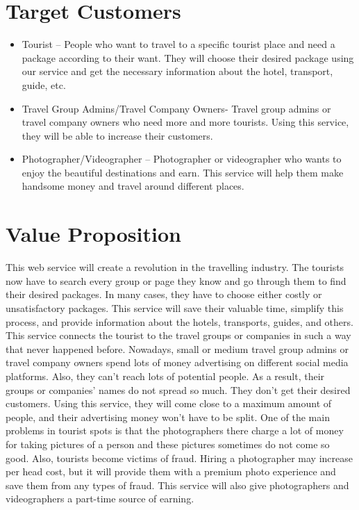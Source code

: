 \documentclass[12pt,a4paper,twoside,openright]{report}
\begin{document}
\section*{Target Customers}
\begin{itemize}
\item Tourist – People who want to travel to a specific tourist place and need a package according to their want. They will choose their desired package using our service and get the necessary information about the hotel, transport, guide, etc.
\item Travel Group Admins/Travel Company Owners- Travel group admins or travel company owners who need more and more tourists. Using this service, they will be able to increase their customers. 
\item Photographer/Videographer – Photographer or videographer who wants to enjoy the beautiful destinations and earn. This service will help them make handsome money and travel around different places.
\end{itemize}

\section*{Value Proposition}
This web service will create a revolution in the travelling industry. The tourists now have to search every group or page they know and go through them to find their desired packages. In many cases, they have to choose either costly or unsatisfactory packages. This service will save their valuable time, simplify this process, and provide information about the hotels, transports, guides, and others. This service connects the tourist to the travel groups or companies in such a way that never happened before. Nowadays, small or medium travel group admins or travel company owners spend lots of money advertising on different social media platforms. Also, they can't reach lots of potential people. As a result, their groups or companies' names do not spread so much. They don't get their desired customers. Using this service, they will come close to a maximum amount of people, and their advertising money won't have to be split. One of the main problems in tourist spots is that the photographers there charge a lot of money for taking pictures of a person and these pictures sometimes do not come so good. Also, tourists become victims of fraud. Hiring a photographer may increase per head cost, but it will provide them with a premium photo experience and save them from any types of fraud. This service will also give photographers and videographers a part-time source of earning.
\newpage
\end{document}
